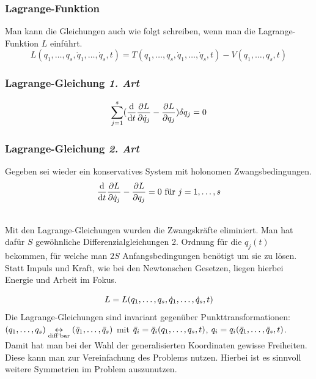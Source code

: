 \subsubsection{Lagrange-Funktion}
Man kann die Gleichungen auch wie folgt schreiben, wenn man die Lagrange-Funktion $L$ einführt.
$$L(q_1, \dots, q_s, \dot{q}_1, \dots, \dot{q}_s, t) = T(q_1, \dots, q_s, \dot{q}_1, \dots, \dot{q}_s, t) - V(q_1, \dots, q_s, t)$$

\subsubsection{Lagrange-Gleichung \textit{1. Art}}
$$\sum_{j = 1}^s  (  \frac{\mathrm d}{\mathrm d t} \frac{\partial L}{\partial \dot{q}_j} - \frac{\partial L}{\partial q_j}  ) \delta q_j = 0$$

\subsubsection{Lagrange-Gleichung \textit{2. Art}}
Gegeben sei wieder ein konservatives System mit holonomen Zwangsbedingungen.
$$ \frac{\mathrm d}{\mathrm d t} \frac{\partial L}{\partial \dot{q}_j} - \frac{\partial L}{\partial q_j} = 0 \text{~für~} j= 1, \dots, s$$

\begin{bemerkung*}[Fazit]~\\
	Mit den Lagrange-Gleichungen wurden die Zwangskräfte eliminiert. Man hat dafür $S$ gewöhnliche Differenzialgleichungen 2. Ordnung für die $q_j(t)$ bekommen, für welche man $2S$ Anfangsbedingungen benötigt um sie zu lösen.
	Statt Impuls und Kraft, wie bei den Newtonschen Gesetzen, liegen hierbei Energie und Arbeit im Fokus.
\end{bemerkung*}

\begin{bemerkung*}[Ausblick]
	$$L = L(q_1, \dots, q_s, \dot{q}_1, \dots, \dot{q}_s, t)$$
	Die Lagrange-Gleichungen sind invariant gegenüber Punkttransformationen: 
	$(q_1, \dots, q_s) \underset{\text{diff'bar}}{\leftrightarrow} (\bar{q}_1, \dots, \bar{q}_s)$ mit $\bar{q}_i = \bar{q}_i(q_1, \dots, q_s, t)$, $q_i = q_i(\bar{q}_1, \dots, \bar{q}_s, t)$.
	Damit hat man bei der Wahl der generalisierten Koordinaten gewisse Freiheiten. Diese kann man zur Vereinfachung des Problems nutzen. Hierbei ist es sinnvoll weitere Symmetrien im Problem auszunutzen.
\end{bemerkung*}

